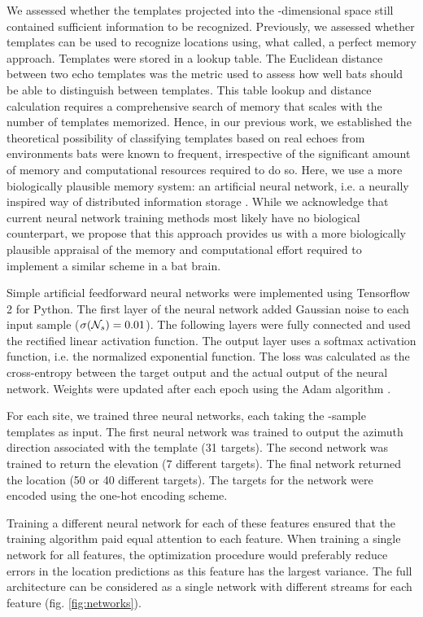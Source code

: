 \documentclass[preprint,5p]{elsarticle}
\begin{document}
We assessed whether the templates projected into the \pca-dimensional space still contained sufficient information to be recognized. Previously, we assessed whether templates can be used to recognize locations using, what \citet{Baddeley2012} called, a perfect memory approach. Templates were stored in a lookup table. The Euclidean distance between two echo templates was the metric used to assess how well bats should be able to distinguish between templates. This table lookup and distance calculation requires a comprehensive search of memory that scales with the number of templates memorized. Hence, in our previous work, we established the theoretical possibility of classifying templates based on real echoes from environments bats were known to frequent, irrespective of the significant amount of memory and computational resources required to do so.  Here, we use a more biologically plausible memory system: an artificial neural network, i.e. a neurally inspired way of distributed information storage \citep{Mcleod1998}. While we acknowledge that current neural network training methods most likely have no biological counterpart, we propose that this approach provides us with a more biologically plausible appraisal of the memory and computational effort required to implement a similar scheme in a bat brain.

Simple artificial feedforward neural networks were implemented using Tensorflow 2 for Python. The first layer of the neural network added Gaussian noise to each input sample ($\sigma(\mathcal{N}_s) = 0.01$). The following layers were fully connected and used the rectified linear activation function. The output layer uses a softmax activation function, i.e. the normalized exponential function. The loss was calculated as the cross-entropy between the target output and the actual output of the neural network. Weights were updated after each epoch using the Adam algorithm \citep{Kingma2014} .

For each site, we trained three neural networks, each taking the \pca-sample templates as input. The first neural network was trained to output the azimuth direction associated with the template (31 targets). The second network was trained to return the elevation (7 different targets). The final network returned the location (50 or 40 different targets). The targets for the network were encoded using the one-hot encoding scheme. 

Training a different neural network for each of these features ensured that the training algorithm paid equal attention to each feature. When training a single network for all features, the optimization procedure would preferably reduce errors in the location predictions as this feature has the largest variance. The full architecture can be considered as a single network with different streams for each feature (fig. \ref{fig:networks}).
\end{document}
